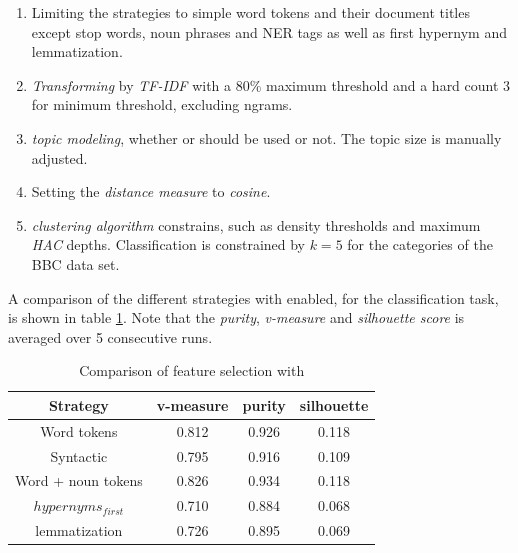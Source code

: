   \begin{enumerate}
    \item Limiting the strategies to simple word tokens and their document titles except stop words, noun phrases and NER tags as well as \wordnet{} first hypernym and \wordnet{}lemmatization.

    \item \emph{Transforming} by \emph{TF-IDF} with a 80\% maximum threshold and a hard count $3$ for minimum threshold, excluding ngrams.

    \item \emph{topic modeling}, whether \lsa{} or \lda{} should be used or not. The topic size is manually adjusted.

    \item Setting the \emph{distance measure} to \emph{cosine}.

    \item \emph{clustering algorithm} constrains, such as density thresholds and maximum \emph{HAC} depths. Classification is constrained by $k=5$ for the categories of the BBC data set.
  \end{enumerate}

A comparison of the different strategies with \lsa{} enabled, for the classification task, is shown in table \ref{comparison_single_with_lsa}. Note that the \emph{purity}, \emph{v-measure} and \emph{silhouette score} is averaged over 5 consecutive runs.

  \begin{table}\label{comparison_single_with_lsa}
    \begin{tabular}{ c | c | c | c }
      Strategy    & v-measure & purity  & silhouette \\ \hline
      Word tokens & 0.812     & 0.926   & 0.118      \\
      Syntactic   & 0.795     & 0.916     & 0.109 \\
      Word + noun tokens & 0.826   & 0.934     & 0.118 \\
      \wordnet{} $hypernyms_{first}$ & 0.710   & 0.884     & 0.068 \\
      \wordnet{} lemmatization   & 0.726   & 0.895     & 0.069 \\
    \end{tabular}
    \caption{Comparison of feature selection with \lsa{}}
  \end{table}

